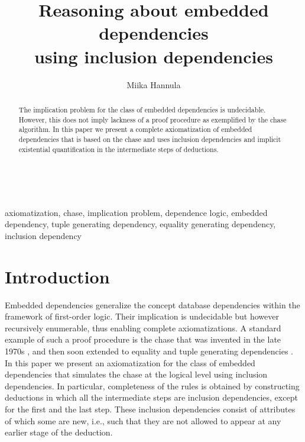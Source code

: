 \documentclass[envcountset]{llncs}
\begin{document}
\title{Reasoning about embedded dependencies\\ using inclusion dependencies}
\author{Miika Hannula}
\maketitle
\

\begin{abstract}
The implication problem for the class of embedded dependencies is undecidable. However, this does not imply lackness of a proof procedure as exemplified by the chase algorithm. In this paper we present a complete axiomatization of embedded dependencies that is based on the chase and uses  inclusion dependencies and implicit existential quantification in the intermediate steps of deductions. \end{abstract}

\begin{keywords}
axiomatization, chase, implication problem, dependence logic, embedded dependency, tuple generating dependency, equality generating dependency, inclusion dependency
\end{keywords}


\section{Introduction}
Embedded dependencies generalize the concept database dependencies within the framework of first-order logic. Their implication is undecidable but however recursively enumerable, thus enabling complete axiomatizations. A standard example of such a proof procedure is the chase that was invented in the late 1970s \cite{aho79,maier79}, and then soon  extended to  equality and tuple generating dependencies \cite{beeri84}. In this paper we present an axiomatization for the class of embedded dependencies that simulates the chase at the logical level 
using inclusion dependencies. In particular, completeness of the rules is obtained by constructing deductions in which all the intermediate steps are inclusion dependencies, except for the first and the last step. These inclusion dependencies consist of attributes of which some are new, i.e., such that they are not allowed to appear at any earlier stage of the deduction. 
\end{document}
